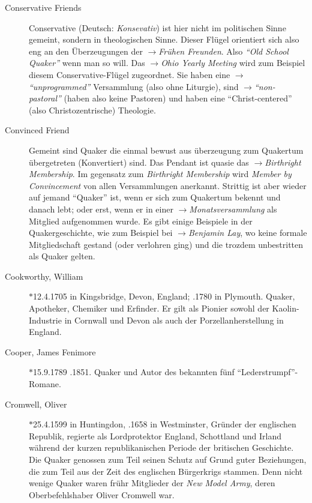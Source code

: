 \begin{description}
 \item[Conservative Friends] Conservative (Deutsch: \textit{Konsevativ}) ist
hier nicht im politischen Sinne gemeint, sondern in theologischen Sinne. Dieser
Flügel orientiert sich also eng an den Überzeugungen der $\to$\textit{Frühen
Freunden}. Also \textit{"`Old School Quaker"'} wenn man so will. Das
$\to$\textit{Ohio Yearly Meeting} wird zum Beispiel diesem
Conservative-Flügel zugeordnet. Sie haben eine $\to$\textit{"`unprogrammed"'}
Versammlung (also ohne Liturgie), sind $\to$\textit{"`non-pastoral"'} (haben
also keine Pastoren) und haben eine "`Christ-centered"' (also Christozentrische)
Theologie.

 \item[Convinced Friend] Gemeint sind Quaker die einmal bewust aus überzeugung
zum Quakertum übergetreten (Konvertiert) sind. Das Pendant ist quasie das
$\to$\textit{Birthright Membership}. Im gegensatz zum \textit{Birthright
Membership} wird \textit{Member by Convincement} von allen Versammlungen
anerkannt. Strittig ist aber wieder auf jemand "`Quaker"' ist, wenn er sich zum
Quakertum bekennt und danach lebt; oder erst, wenn er in einer
$\to$\textit{Monatsversammlung} als Mitglied aufgenommen wurde. Es gibt einige
Beispiele in der Quakergeschichte, wie zum Beispiel bei $\to$\textit{Benjamin
Lay}, wo keine formale Mitgliedschaft gestand (oder verlohren ging) und die
trozdem unbestritten als Quaker gelten.

 \item[Cookworthy, William] $\ast$12.4.1705 in Kingsbridge, Devon, England;
.1780 in Plymouth. Quaker, Apotheker, Chemiker und Erfinder. Er gilt
als Pionier sowohl der Kaolin-Industrie in Cornwall und Devon als auch der
Porzellanherstellung in England.

 \item[Cooper, James Fenimore] $\ast$15.9.1789 .1851. Quaker und Autor
 des bekannten fünf "`Lederstrumpf"'-Romane. 

 \item[Cromwell, Oliver] $\ast$25.4.1599 in Huntingdon, .1658 in
Westminster, Gründer der englischen Republik, regierte als Lordprotektor
England, Schottland und Irland während der kurzen republikanischen Periode der
britischen Geschichte. Die Quaker genossen zum Teil seinen Schutz auf Grund
guter Beziehungen, die zum Teil aus der Zeit des englischen Bürgerkrigs stammen.
Denn nicht wenige Quaker waren frühr Mitglieder der \textit{New Model Army},
deren Oberbefehlshaber Oliver Cromwell war.

 \end{description}

\normalsize
